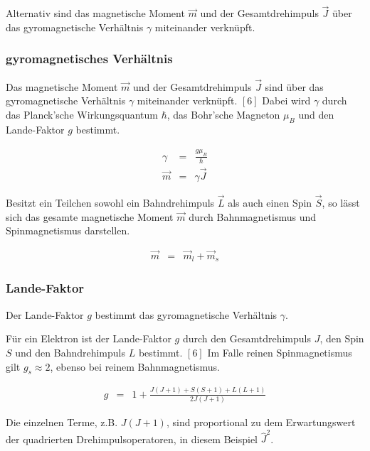 \documentclass[12pt,a4paper]{scrartcl}
\numberwithin{equation}{section} %
\renewcommand{\[}{} %
\renewcommand{\]}{\noindent} %
\begin{document}
Alternativ sind das magnetische Moment \(\vec{m}\) und der
Gesamtdrehimpuls \(\vec{J}\) über das gyromagnetische Verhältnis
\(\gamma\) miteinander verknüpft.

\hypertarget{gyromagnetisches-verhuxe4ltnis}{%
\subsubsection{gyromagnetisches
Verhältnis}\label{gyromagnetisches-verhuxe4ltnis}}

Das magnetische Moment \(\vec{m}\) und der Gesamtdrehimpuls \(\vec{J}\)
sind über das gyromagnetische Verhältnis \(\gamma\) miteinander
verknüpft. \([6]\) Dabei wird \(\gamma\) durch das Planck'sche
Wirkungsquantum \(\hbar\), das Bohr'sche Magneton \(\mu_{B}\) und den
Lande-Faktor \(g\) bestimmt.

\[
\begin{eqnarray}
    \gamma &=& \frac{g\mu_B}{\hbar} \\
    \vec{m} &=& \gamma \vec{J}
\end{eqnarray}
\]

Besitzt ein Teilchen sowohl ein Bahndrehimpuls \(\vec L\) als auch einen
Spin \(\vec S\), so lässt sich das gesamte magnetische Moment
\(\vec{m}\) durch Bahnmagnetismus und Spinmagnetismus darstellen.

\[
\begin{eqnarray}
    \vec m &=& \vec m_l + \vec m_s
\end{eqnarray}
\]

\hypertarget{lande-faktor}{%
\subsubsection{Lande-Faktor}\label{lande-faktor}}

Der Lande-Faktor \(g\) bestimmt das gyromagnetische Verhältnis
\(\gamma\).

Für ein Elektron ist der Lande-Faktor \(g\) durch den Gesamtdrehimpuls
\(J\), den Spin \(S\) und den Bahndrehimpuls \(L\) bestimmt. \([6]\) Im
Falle reinen Spinmagnetismus gilt \(g_{s} \approx 2\), ebenso bei reinem
Bahnmagnetismus.

\[
\begin{eqnarray}
    g &=& 1 + \frac{J(J+1) + S(S+1) + L(L+1)}{2J(J+1)}
\end{eqnarray}
\]

Die einzelnen Terme, z.B. \(J(J+1)\), sind proportional zu dem
Erwartungswert der quadrierten Drehimpulsoperatoren, in diesem Beispiel
\(\hat J^2\).
\end{document}
